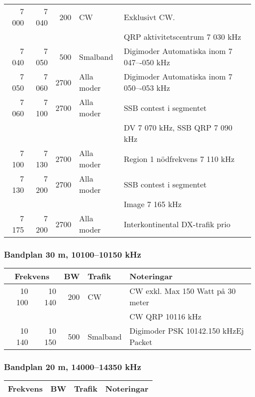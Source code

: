 \begin{landscape}
\begin{tabular}{rrrll}
7 000 & 7 040 & 200  & CW         & Exklusivt CW.                             \\
      &       &      &            & QRP aktivitetscentrum 7 030 kHz           \\ \hline
7 040 & 7 050 & 500  & Smalband   & Digimoder Automatiska inom 7 047–-050 kHz \\ \hline
7 050 & 7 060 & 2700 & Alla moder & Digimoder Automatiska inom 7 050–-053 kHz \\ \hline
7 060 & 7 100 & 2700 & Alla moder & SSB contest i segmentet                   \\
      &       &      &            & DV 7 070 kHz, SSB QRP 7 090 kHz           \\ \hline
7 100 & 7 130 & 2700 & Alla moder & Region 1 nödfrekvens 7 110 kHz            \\ \hline
7 130 & 7 200 & 2700 & Alla moder & SSB contest i segmentet                   \\
      &       &      &            & Image 7 165 kHz                           \\ \hline
7 175 & 7 200 & 2700 & Alla moder & Interkontinental DX-trafik prio           \\ \hline
\end{tabular}


\subsubsection{Bandplan 30 m, 10100--10150 kHz}
\begin{tabular}{rrrll}
\multicolumn{2}{c}{\textbf{Frekvens}} & \textbf{BW} & \textbf{Trafik} & \textbf{Noteringar} \\ \hline

10 100 & 10 140 & 200 & CW       & CW exkl. Max 150 Watt på 30 meter    \\
       &        &     &          & CW QRP 10116 kHz                     \\ \hline
10 140 & 10 150 & 500 & Smalband & Digimoder PSK 10142.150 kHzEj Packet \\ \hline
\end{tabular}



\subsubsection{Bandplan 20 m, 14000--14350 kHz}
\begin{tabular}{rrrll}
\multicolumn{2}{c}{\textbf{Frekvens}} & \textbf{BW} & \textbf{Trafik} & \textbf{Noteringar} \\ \hline


\end{tabular}
\end{landscape}
